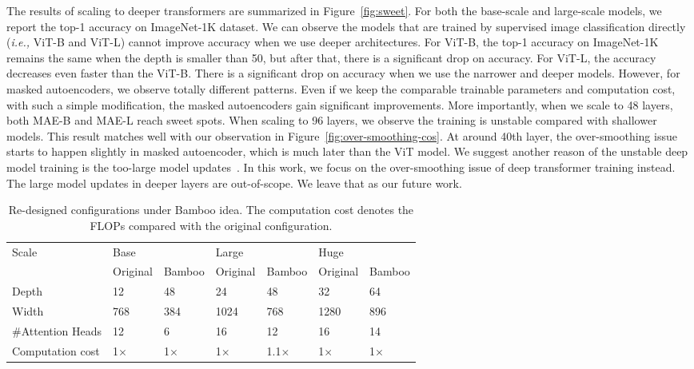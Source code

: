 \documentclass{article}
\theoremstyle{plain}
\theoremstyle{definition}
\theoremstyle{remark}
\newcommand{\ie}{\emph{i.e.,}\xspace}
\begin{document}
The results of scaling to deeper transformers are summarized in Figure~\ref{fig:sweet}. For both the base-scale and large-scale models, we report the top-1 accuracy on ImageNet-1K dataset. We can observe the models that are trained by supervised image classification directly (\ie ViT-B and ViT-L) cannot improve accuracy when we use  deeper architectures. For ViT-B, the top-1 accuracy on ImageNet-1K remains the same when the depth is smaller than 50, but after that, there is a significant drop on accuracy. For ViT-L, the accuracy decreases even faster than the ViT-B. There is a significant drop on accuracy  when we use the narrower and deeper models. However, for masked autoencoders, we observe totally different patterns. Even if we keep the comparable trainable parameters and computation cost, with such a simple modification, the masked autoencoders gain significant improvements. More importantly, when we scale to 48 layers, both 
MAE-B and MAE-L reach sweet spots. When scaling to 96 layers, we observe the training is unstable compared with shallower models. This result matches well with our observation in Figure~\ref{fig:over-smoothing-cos}. At around 40th layer, the over-smoothing issue starts to happen slightly in masked autoencoder, which is much later than the ViT model. We suggest another reason of the unstable deep model training is the too-large model updates~\citep{wang2022deepnet}. In this work, we focus on the over-smoothing issue of deep transformer training instead. The large model updates in deeper layers are out-of-scope. We leave that as our future work.


\begin{table*}[t]
\caption{Re-designed configurations under Bamboo idea. The computation cost denotes the FLOPs compared with the original configuration.}
\centering
\small
\begin{tabular}{l ll ll ll}
\toprule 
Scale                  & \multicolumn{2}{l}{Base} & \multicolumn{2}{l}{Large} & \multicolumn{2}{l}{Huge} \\  \cmidrule(lr){2-3} \cmidrule(lr){4-5}\cmidrule(lr){6-7}
                 & Original & Bamboo & Original & Bamboo & Original & Bamboo  \\ \midrule
Depth             & 12   & 48   & 24   & 48    & 32   & 64    \\ 
Width             & 768  & 384  & 1024  & 768 & 1280  & 896 \\
\#Attention Heads & 12   & 6    & 16    & 12   & 16    & 14    \\
Computation cost  & 1$\times$    & 1$\times$  & 1$\times$    & 1.1$\times$ & 1$\times$    & 1$\times$   \\ \bottomrule
\end{tabular}
\label{tbl:bamboo}
\vspace{-0.4cm}
\end{table*}
\end{document}
